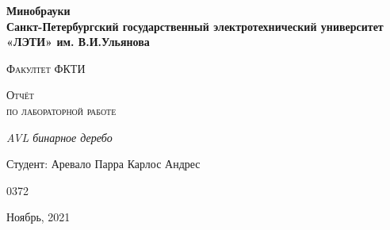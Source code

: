 \begin{titlepage}
  \centering
  {\bfseries\LARGE
  Минобрауки\\
  Санкт-Петербургский государственный электротехнический
  университет «ЛЭТИ» им. В.И.Ульянова \par}
  \vspace{1cm}
  {\scshape\Large Факултет ФКТИ \par}
  \vspace{2.5cm}
  {\scshape\Large Отчёт \\по лабораторной работе\\\par}
  \vspace{1.5cm}
  {\itshape\Large AVL бинарное деребо \par}
  \vfill
  {\Large Студент: Аревало Парра Карлос Андрес \par}
  \vfill
  {\large 0372}
  \vfill
  {\Large Ноябрь, 2021 \par}
\end{titlepage}
